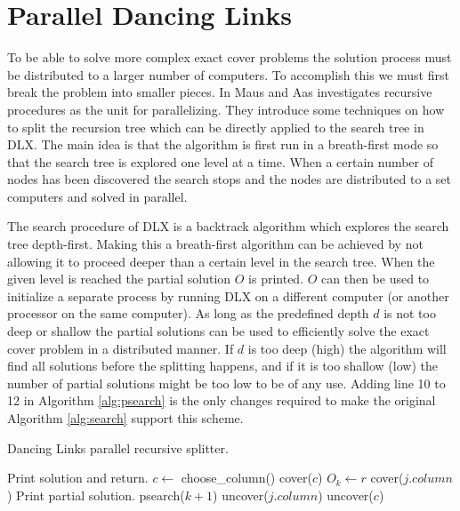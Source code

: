 \section{Parallel Dancing Links}

To be able to solve more complex exact cover problems the solution process must be distributed to a larger number of computers.
To accomplish this we must first break the problem into smaller pieces.
In \cite{maus-prp} Maus and Aas investigates recursive procedures as the unit for parallelizing.
They introduce some techniques on how to split the recursion tree which can be directly applied to the search tree in DLX.
The main idea is that the algorithm is first run in a breath-first mode so that the search tree is explored one level at a time.
When a certain number of nodes has been discovered the search stops and the nodes are distributed to a set computers and solved in parallel.

The search procedure of DLX is a backtrack algorithm which explores the search tree depth-first.
Making this a breath-first algorithm can be achieved by not allowing it to proceed deeper than a certain level in the search tree.
When the given level is reached the partial solution $O$ is printed.
$O$ can then be used to initialize a separate process by running DLX on a different computer (or another processor on the same computer).
As long as the predefined depth $d$ is not too deep or shallow the partial solutions can be used to efficiently solve the exact cover problem in a distributed manner.
If $d$ is too deep (high) the algorithm will find all solutions before the splitting happens, and if it is too shallow (low) the number of partial solutions might be too low to be of any use.
Adding line 10 to 12 in Algorithm \ref{alg:psearch} is the only changes required to make the original Algorithm \ref{alg:search} support this scheme.
\begin{algorithm}[htbp]
	\caption{Dancing Links parallel recursive splitter.}
	\label{alg:psearch}
	\begin{distribalgo}[1]
				\STATE Print solution and return.  
			\ENDIF
			\STATE $c \leftarrow$ choose\_column()
			\STATE cover($c$)
				\STATE $O_k \leftarrow r$  
					\STATE cover($j.column$)
				\ENDFOR
					\STATE Print partial solution.  
				\ELSE
					\STATE psearch($k + 1$)
				\ENDIF
					\STATE uncover($j.column$)
				\ENDFOR
			\ENDFOR
			\STATE uncover($c$)
		\ENDPROC
	\end{distribalgo}
\end{algorithm}

